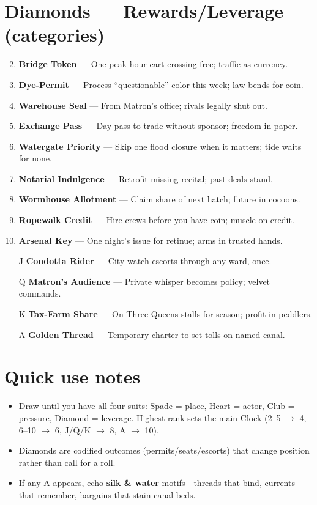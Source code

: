 \section*{Diamonds --- Rewards/Leverage (categories)}
\label{sec:silkstrand-rewards}
\begin{enumerate}
\setcounter{enumi}{1}
\item \textbf{Bridge Token} --- One peak-hour cart crossing free; traffic as currency.
\item \textbf{Dye-Permit} --- Process ``questionable'' color this week; law bends for coin.
\item \textbf{Warehouse Seal} --- From Matron's office; rivals legally shut out.
\item \textbf{Exchange Pass} --- Day pass to trade without sponsor; freedom in paper.
\item \textbf{Watergate Priority} --- Skip one flood closure when it matters; tide waits for none.
\item \textbf{Notarial Indulgence} --- Retrofit missing recital; past deals stand.
\item \textbf{Wormhouse Allotment} --- Claim share of next hatch; future in cocoons.
\item \textbf{Ropewalk Credit} --- Hire crews before you have coin; muscle on credit.
\item \textbf{Arsenal Key} --- One night's issue for retinue; arms in trusted hands.
\item[J] \textbf{Condotta Rider} --- City watch escorts through any ward, once.
\item[Q] \textbf{Matron's Audience} --- Private whisper becomes policy; velvet commands.
\item[K] \textbf{Tax-Farm Share} --- On Three-Queens stalls for season; profit in peddlers.
\item[A] \textbf{Golden Thread} --- Temporary charter to set tolls on named canal.
\end{enumerate}

\section*{Quick use notes}
\label{sec:silkstrand-quick-use}
\begin{itemize}
\item Draw until you have all four suits: Spade = place, Heart = actor, Club = pressure, Diamond = leverage. Highest rank sets the main Clock (2--5 $\rightarrow$ 4, 6--10 $\rightarrow$ 6, J/Q/K $\rightarrow$ 8, A $\rightarrow$ 10).
\item Diamonds are codified outcomes (permits/seats/escorts) that change position rather than call for a roll.
\item If any A appears, echo \textbf{silk \& water} motifs---threads that bind, currents that remember, bargains that stain canal beds.
\end{itemize}

